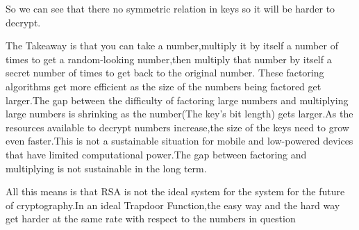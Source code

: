 \documentclass{article}
\begin{document}
So we can see that there no symmetric relation in keys so it will be harder to decrypt.

The Takeaway is that you can take a number,multiply it by itself a number of times to get a random-looking number,then multiply that number by itself a secret number of times to get back to the original number.
These factoring algorithms get more efficient as the size of the numbers being factored get larger.The gap between the difficulty of factoring large numbers and multiplying large numbers is shrinking as the number(The key's bit length) gets larger.As the resources available to decrypt numbers increase,the size of the keys need to grow even faster.This is not a sustainable situation for mobile and low-powered devices that have limited computational power.The gap between factoring and multiplying is not sustainable in the long term.

All this means is that RSA is not the ideal system for the system for the future of cryptography.In an ideal Trapdoor  Function,the easy way and the hard way get harder at the same rate with respect to the numbers in question
\end{document}
